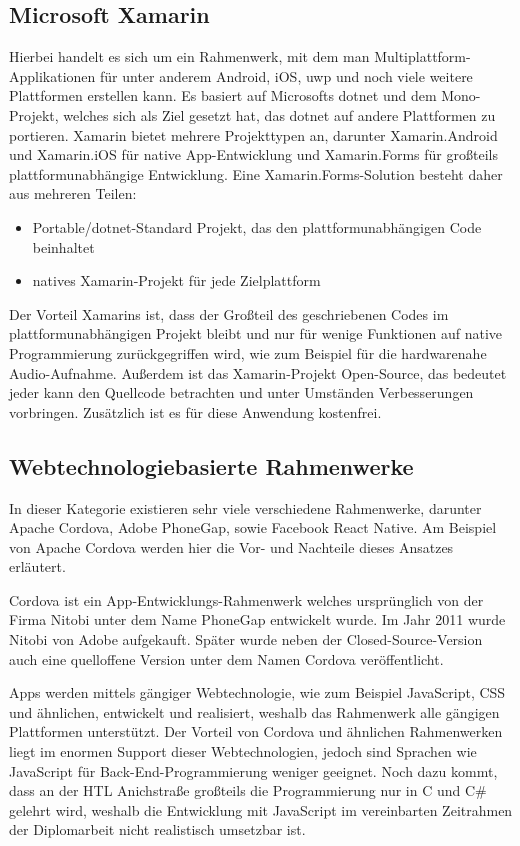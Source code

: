 \subsection{Microsoft Xamarin}
Hierbei handelt es sich um ein Rahmenwerk, mit dem man Multiplattform-Applikationen für unter anderem Android, iOS, \ac{uwp} und noch viele weitere Plattformen erstellen kann.
Es basiert auf Microsofts \ac{dotnet} und dem Mono-Projekt, welches sich als Ziel gesetzt hat, das \ac{dotnet} auf andere Plattformen zu portieren.
Xamarin bietet mehrere Projekttypen an, darunter Xamarin.Android und Xamarin.iOS für native App-Entwicklung und Xamarin.Forms für großteils plattformunabhängige Entwicklung.
Eine Xamarin.Forms-Solution besteht daher aus mehreren Teilen:
\begin{itemize}
    \item Portable/\ac{dotnet}-Standard Projekt, das den plattformunabhängigen Code beinhaltet
    \item natives Xamarin-Projekt für jede Zielplattform
\end{itemize}
Der Vorteil Xamarins ist, dass der Großteil des geschriebenen Codes im plattformunabhängigen Projekt bleibt und nur für wenige Funktionen auf native Programmierung zurückgegriffen wird, wie zum Beispiel für die hardwarenahe Audio-Aufnahme.
Außerdem ist das Xamarin-Projekt Open-Source, das bedeutet jeder kann den Quellcode betrachten und unter Umständen Verbesserungen vorbringen.
Zusätzlich ist es für diese Anwendung kostenfrei.

\subsection{Webtechnologiebasierte Rahmenwerke}
In dieser Kategorie existieren sehr viele verschiedene Rahmenwerke, darunter Apache Cordova, Adobe PhoneGap, sowie Facebook React Native.
Am Beispiel von Apache Cordova werden hier die Vor- und Nachteile dieses Ansatzes erläutert.

Cordova ist ein App-Entwicklungs-Rahmenwerk welches ursprünglich von der Firma Nitobi unter dem Name PhoneGap entwickelt wurde.
Im Jahr 2011 wurde Nitobi von Adobe aufgekauft.
Später wurde neben der Closed-Source-Version auch eine quelloffene Version unter dem Namen Cordova veröffentlicht. \cite[vgl.][]{adobe-phonegap}\par

Apps werden mittels gängiger Webtechnologie, wie zum Beispiel JavaScript, CSS und ähnlichen, entwickelt und realisiert, weshalb das Rahmenwerk alle gängigen Plattformen unterstützt.
Der Vorteil von Cordova und ähnlichen Rahmenwerken liegt im enormen Support dieser Webtechnologien, jedoch sind Sprachen wie JavaScript für Back-End-Programmierung weniger geeignet.
Noch dazu kommt, dass an der HTL Anichstraße großteils die Programmierung nur in C und C\# gelehrt wird, weshalb die Entwicklung mit JavaScript im vereinbarten Zeitrahmen der Diplomarbeit nicht realistisch umsetzbar ist.

